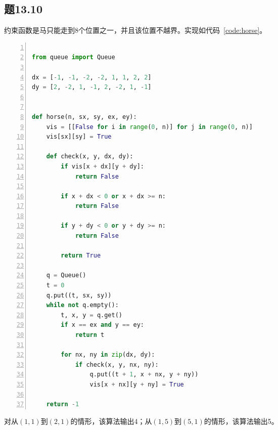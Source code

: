 \documentclass[a4paper,twoside]{article}
\begin{document}
\begin{spacing}{1.2}
\section{题13.10}

约束函数是马只能走到8个位置之一，并且该位置不越界。实现如代码~\ref{code:horse}。

\begin{lstlisting}[language=Python,numbers=left,style=PythonStyle,caption=跳马问题,label={code:horse}]

from queue import Queue

dx = [-1, -1, -2, -2, 1, 1, 2, 2]
dy = [2, -2, 1, -1, 2, -2, 1, -1]


def horse(n, sx, sy, ex, ey):
    vis = [[False for i in range(0, n)] for j in range(0, n)]
    vis[sx][sy] = True

    def check(x, y, dx, dy):
        if vis[x + dx][y + dy]:
            return False

        if x + dx < 0 or x + dx >= n:
            return False

        if y + dy < 0 or y + dy >= n:
            return False

        return True

    q = Queue()
    t = 0
    q.put((t, sx, sy))
    while not q.empty():
        t, x, y = q.get()
        if x == ex and y == ey:
            return t

        for nx, ny in zip(dx, dy):
            if check(x, y, nx, ny):
                q.put((t + 1, x + nx, y + ny))
                vis[x + nx][y + ny] = True

    return -1
\end{lstlisting}

对从$(1,1)$到$(2,1)$的情形，该算法输出4；从$(1,5)$到$(5,1)$的情形，该算法输出5。

\end{spacing}
\end{document}
